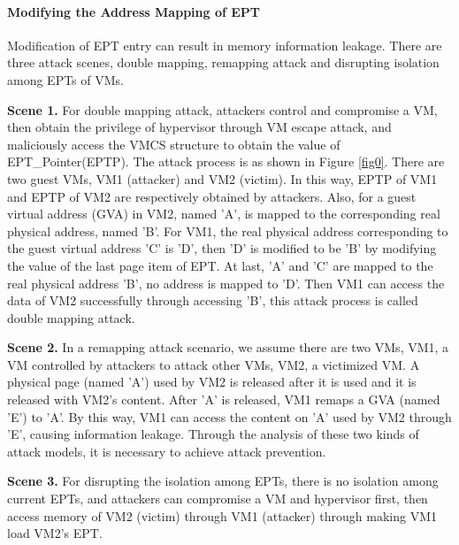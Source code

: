 ﻿\documentclass[conference]{IEEEtran}
\begin{document}
\paragraph{Modifying the Address Mapping of EPT}
Modification of EPT entry can result in memory information leakage. There are three attack scenes, double mapping, remapping attack and disrupting isolation among EPTs of VMs.

\textbf{Scene 1.} 
    For double mapping attack, attackers control and compromise a VM, then obtain the privilege of hypervisor through VM escape attack, and maliciously access the VMCS structure to obtain the value of EPT\_Pointer(EPTP). The attack process is as shown in Figure \ref{fig0}. There are two guest VMs, VM1 (attacker) and VM2 (victim). In this way, EPTP of VM1 and EPTP of VM2 are respectively obtained by attackers. Also, for a guest virtual address (GVA) in VM2, named 'A', is mapped to the corresponding real physical address, named 'B'. For VM1, the real physical address corresponding to the guest virtual address 'C' is 'D', then 'D' is modified to be 'B' by modifying the value of the last page item of EPT. At last, 'A' and 'C' are mapped to the real physical address 'B', no address is mapped to 'D'. Then VM1 can access the data of VM2 successfully through accessing 'B', this attack process is called double mapping attack.



\textbf{Scene 2.}
    In a remapping attack scenario, we assume there are two VMs, VM1, a VM controlled by attackers to attack other VMs, VM2, a victimized VM.
 A physical page (named 'A') used by VM2 is released after it is used and it is released with VM2's content. After 'A' is released, VM1 remaps a GVA (named 'E') to 'A'. By this way, VM1 can access the content on 'A' used by VM2 through 'E', causing information leakage.
Through the analysis of these two kinds of attack models, it is necessary to achieve attack prevention.

\textbf{Scene 3.}
 For disrupting the isolation among EPTs, there is no isolation among current EPTs, and attackers can compromise a VM and hypervisor first, then access memory of VM2 (victim) through VM1 (attacker) through making VM1 load VM2's EPT.

\end{document}

